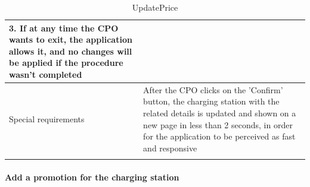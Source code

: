 \begin{center}
\begin{longtable}{p{4cm} p{11cm}}
                    3. If at any time the CPO wants to exit, the application allows it, and no changes will be applied if the procedure wasn't completed \\
     \hline
     Special requirements & After the CPO clicks on the 'Confirm' button, the charging station with the related details is updated and shown on a new page in less than 2 seconds, in order for the application to be perceived as fast and responsive\\
     \hline
    \caption{UpdatePrice}
    \label{tab:UpdatePrice}
    \end{longtable}
\end{center}


\paragraph{Add a promotion for the charging station}
